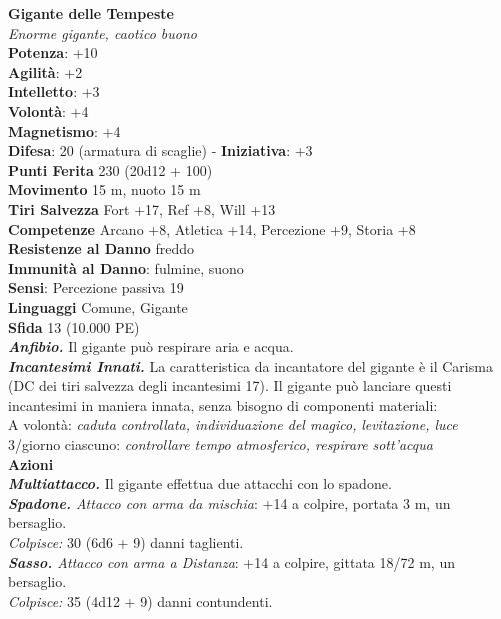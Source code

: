\begin{multicols}{2}
\medskip\textbf{Gigante delle Tempeste}\\
\emph{Enorme gigante, caotico buono}\\
\textbf{Potenza}: +10\\
\textbf{Agilità}: +2\\
\textbf{Intelletto}: +3\\
\textbf{Volontà}: +4\\
\textbf{Magnetismo}: +4\\
\textbf{Difesa}: 20 (armatura di scaglie) - \textbf{Iniziativa}: +3\\
\textbf{Punti Ferita} 230 (20d12 + 100)\\
\textbf{Movimento} 15 m, nuoto 15 m\\
\textbf{Tiri Salvezza} Fort +17, Ref +8, Will +13\\
\textbf{Competenze} Arcano +8, Atletica +14, Percezione +9, Storia +8\\
\textbf{Resistenze al Danno} freddo\\
\textbf{Immunità al Danno}: fulmine, suono\\
\textbf{Sensi}: Percezione passiva 19\\
\textbf{Linguaggi} Comune, Gigante\\
\textbf{Sfida} 13 (10.000 PE)\smallskip\\
\emph{\textbf{Anfibio.}} Il gigante può respirare aria e acqua.\\
\emph{\textbf{Incantesimi Innati.}} La caratteristica da incantatore del gigante è il Carisma (DC dei tiri salvezza degli incantesimi 17). Il gigante può lanciare questi incantesimi in maniera innata, senza bisogno di componenti materiali:\\
A volontà: \emph{caduta controllata, individuazione del magico,} \emph{levitazione, luce}\\
3/giorno ciascuno: \emph{controllare tempo atmosferico, respirare} \emph{sott'acqua}\\
\smallskip\textbf{Azioni}\\
\emph{\textbf{Multiattacco.}} Il gigante effettua due attacchi con lo spadone.\\
\emph{\textbf{Spadone.} Attacco con arma da mischia}: +14 a colpire, portata 3 m, un bersaglio.\\
\emph{Colpisce:} 30 (6d6 + 9) danni taglienti.\\
\emph{\textbf{Sasso.} Attacco con arma a Distanza}: +14 a colpire, gittata 18/72 m, un bersaglio.\\
\emph{Colpisce:} 35 (4d12 + 9) danni contundenti.\\

\end{multicols}
